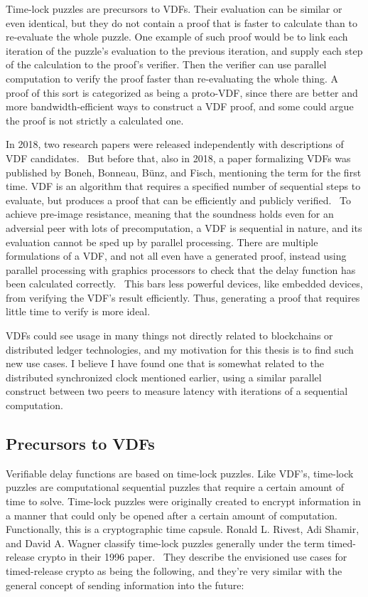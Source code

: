 Time-lock puzzles are precursors to VDFs. Their evaluation can be similar or even identical, but they do not contain a proof that is faster to calculate than to re-evaluate the whole puzzle. One example of such proof would be to link each iteration of the puzzle's evaluation to the previous iteration, and supply each step of the calculation to the proof's verifier. Then the verifier can use parallel computation to verify the proof faster than re-evaluating the whole thing. A proof of this sort is categorized as being a proto-VDF, since there are better and more bandwidth-efficient ways to construct a VDF proof, and some could argue the proof is not strictly a calculated one.

In 2018, two research papers were released independently with descriptions of VDF candidates.~\cite{Wesolowski2018-rf, Pietrzak2018-xs} But before that, also in 2018, a paper formalizing VDFs was published by Boneh, Bonneau, Bünz, and Fisch, mentioning the term for the first time. VDF is an algorithm that requires a specified number of sequential steps to evaluate, but produces a proof that can be efficiently and publicly verified.~\cite{Boneh_undated-ml} To achieve pre-image resistance, meaning that the soundness holds even for an adversial peer with lots of precomputation, a VDF is sequential in nature, and its evaluation cannot be sped up by parallel processing. There are multiple formulations of a VDF, and not all even have a generated proof, instead using parallel processing with graphics processors to check that the delay function has been calculated correctly.~\cite{Yakovenko2018-zn} This bars less powerful devices, like embedded devices, from verifying the VDF's result efficiently. Thus, generating a proof that requires little time to verify is more ideal.~\cite{Boneh_undated-ml}

VDFs could see usage in many things not directly related to blockchains or distributed ledger technologies, and my motivation for this thesis is to find such new use cases. I believe I have found one that is somewhat related to the distributed synchronized clock mentioned earlier, using a similar parallel construct between two peers to measure latency with iterations of a sequential computation.


\subsection{Precursors to VDFs}
Verifiable delay functions are based on time-lock puzzles. Like VDF's, time-lock puzzles are computational sequential puzzles that require a certain amount of time to solve.\cite{Rivest_undated-qr} Time-lock puzzles were originally created to encrypt information in a manner that could only be opened after a certain amount of computation. Functionally, this is a cryptographic time capsule. Ronald L. Rivest, Adi Shamir, and David A. Wagner classify time-lock puzzles generally under the term timed-release crypto in their 1996 paper.~\cite{Rivest_undated-qr} They describe the envisioned use cases for timed-release crypto as being the following, and they're very similar with the general concept of sending information into the future:

